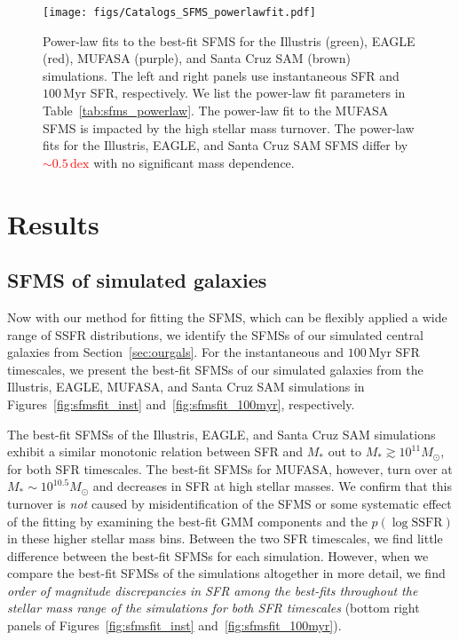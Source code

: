 \documentclass[preprint2,tighten]{aastex62}
\newcommand{\todo}[1]{{\bf \textcolor{red}{ #1}}}
\begin{document}
\begin{figure}
\begin{center}
\texttt{[image: figs/Catalogs\_SFMS\_powerlawfit.pdf]} 
\caption{Power-law fits to the best-fit SFMS for the Illustris (green), 
    EAGLE (red), MUFASA (purple), and Santa Cruz SAM (brown) simulations. 
    The left and right panels use instantaneous SFR and $100\,\mathrm{Myr}$ 
    SFR, respectively. We list the power-law fit parameters in 
    Table~\ref{tab:sfms_powerlaw}. The power-law fit to the MUFASA SFMS 
    is impacted by the high stellar mass turnover. The power-law fits for 
    the Illustris, EAGLE, and Santa Cruz SAM SFMS differ by \todo{${\sim}0.5\,\mathrm{dex}$}
    with no significant mass dependence.}
    \label{fig:sfmsfit_powerlaw}
\end{center}
\end{figure}

\section{Results} \label{sec:results}
\subsection{SFMS of simulated galaxies}
Now with our method for fitting the SFMS, which can be flexibly 
applied a wide range of SSFR distributions, we identify the SFMSs of our simulated
central galaxies from Section~\ref{sec:ourgals}. For the instantaneous and 
$100\,\mathrm{Myr}$ SFR timescales, we present the best-fit SFMSs of our 
simulated galaxies from the Illustris, EAGLE, MUFASA, and Santa Cruz SAM 
simulations in Figures~\ref{fig:sfmsfit_inst} and~\ref{fig:sfmsfit_100myr}, 
respectively. %

The best-fit SFMSs of the Illustris, EAGLE, and Santa Cruz SAM simulations
exhibit a similar monotonic relation between SFR and $M_*$ out to 
$M_* \gtrsim 10^{11}M_\odot$, for both SFR timescales. The best-fit SFMSs 
for MUFASA, however, turn over at 
$M_*{\sim}10^{10.5} M_\odot$ and decreases in SFR at high stellar masses. 
We confirm that this turnover is \emph{not} caused by misidentification of 
the SFMS or some systematic effect of the fitting by examining the 
best-fit GMM components  and the $p(\log\mathrm{SSFR})$ in these higher 
stellar mass bins. Between the two SFR timescales, we find little difference 
between the best-fit SFMSs for each simulation. However, when we compare the 
best-fit SFMSs of the simulations altogether in more detail, we find 
\emph{order of magnitude discrepancies in SFR among the best-fits throughout 
the stellar mass range of the simulations for both SFR timescales} (bottom 
right panels of Figures~\ref{fig:sfmsfit_inst} and~\ref{fig:sfmsfit_100myr}). 
\end{document}
